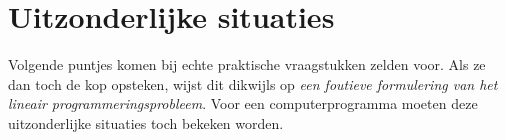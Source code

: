 %
%
%


\section{Uitzonderlijke situaties}
Volgende puntjes komen bij echte praktische vraagstukken zelden
voor. Als ze dan toch de kop opsteken, wijst dit dikwijls op \emph{een
foutieve formulering van het lineair programmeringsprobleem}.
Voor een computerprogramma moeten deze uitzonderlijke situaties
toch bekeken worden.



